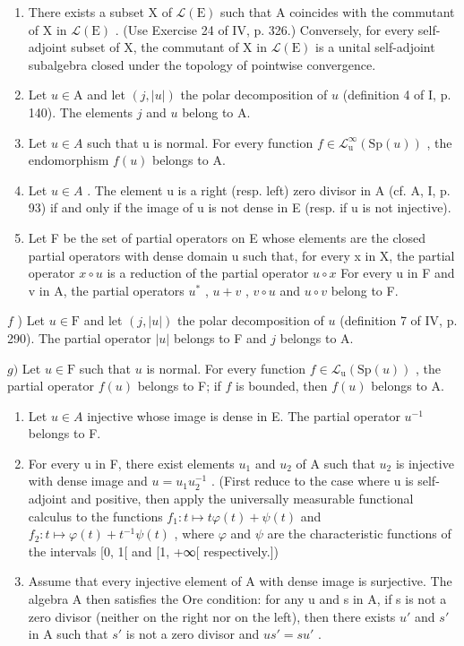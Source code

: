 \begin{enumerate}
\def\labelenumi{\alph{enumi})}
\item
  There exists a subset X of \(\mathcal{L}(\mathrm{E})\) such that A coincides with the commutant of X in \(\mathcal{L}(\mathrm{E})\) . (Use Exercise 24 of IV, p. 326.) Conversely, for every self-adjoint subset of X, the commutant of X in \(\mathcal{L}(\mathrm{E})\) is a unital self-adjoint subalgebra closed under the topology of pointwise convergence.
\item
  Let \(u \in \mathrm{A}\) and let \((j, |u|)\) the polar decomposition of \(u\) (definition 4 of I, p. 140). The elements \(j\) and \(u\) belong to A.
\item
  Let \(u \in A\) such that u is normal. For every function \(f \in \mathcal{L}_{\mathrm{u}}^{\infty}(\mathrm{Sp}(u))\) , the endomorphism \(f(u)\) belongs to A.
\item
  Let \(u \in A\) . The element u is a right (resp. left) zero divisor in A (cf. A, I, p. 93) if and only if the image of u is not dense in E (resp. if u is not injective).
\item
  Let F be the set of partial operators on E whose elements are the closed partial operators with dense domain u such that, for every x in X, the partial operator \(x \circ u\) is a reduction of the partial operator \(u \circ x\) For every u in F and v in A, the partial operators \(u^{*}\) , \(u + v\) , \(v \circ u\) and \(u \circ v\) belong to F.
\end{enumerate}

\(f\) ) Let \(u\in \mathrm{F}\) and let \((j,|u|)\) the polar decomposition of \(u\) (definition 7 of IV, p. 290). The partial operator \(|u|\) belongs to F and \(j\) belongs to A.

\(g)\) Let \(u \in \mathrm{F}\) such that \(u\) is normal. For every function \(f \in \mathcal{L}_{\mathrm{u}}(\mathrm{Sp}(u))\) , the partial operator \(f(u)\) belongs to F; if \(f\) is bounded, then \(f(u)\) belongs to A.

\begin{enumerate}
\def\labelenumi{\alph{enumi})}
\setcounter{enumi}{7}
\item
  Let \(u \in A\) injective whose image is dense in E. The partial operator \(u^{-1}\) belongs to F.
\item
  For every u in F, there exist elements \(u_{1}\) and \(u_{2}\) of A such that \(u_{2}\) is injective with dense image and \(u = u_{1}u_{2}^{-1}\) . (First reduce to the case where u is self-adjoint and positive, then apply the universally measurable functional calculus to the functions \(f_{1}: t \mapsto t\varphi(t) + \psi(t)\) and \(f_{2}: t \mapsto \varphi(t) + t^{-1}\psi(t)\) , where \(\varphi\) and \(\psi\) are the characteristic functions of the intervals {[}0, 1{[} and {[}1, +∞{[} respectively.{]})
\item
  Assume that every injective element of A with dense image is surjective. The algebra A then satisfies the Ore condition: for any u and s in A, if s is not a zero divisor (neither on the right nor on the left), then there exists \(u'\) and \(s'\) in A such that \(s'\) is not a zero divisor and \(us' = su'\) .
\end{enumerate}

